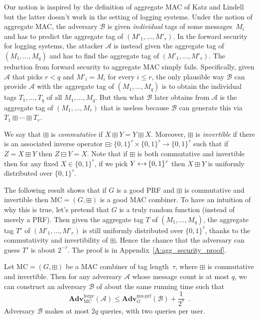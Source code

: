 \documentclass[sigconf]{sty/acmart}
\newcommand{\heading}[1]{\vspace{6pt}\noindent{\underline{\textsc{#1}}}}
\newcommand{\bits}{\{0, 1\}}
\newcommand{\advA}{{\mathcal A}}
\newcommand{\muprf}{\mathrm{mu}\textrm{-}\mathrm{prf}}
\newcommand{\Adv}{\mathbf{Adv}}
\newcommand{\getsr}{{\:{\leftarrow{\hspace*{-3pt}\raisebox{.75pt}{$\scriptscriptstyle\$$}}}\:}}
\newcommand{\advB}{{\mathcal B}}
\newcommand{\forge}{\mathrm{forge}}
\newcommand{\AMAC}{\mathrm{MC}}
\newcommand{\combine}{\boxplus}
\newcommand{\combinv}{\boxminus}
\begin{document}
\heading{Discussion.} Our notion is inspired by the definition of aggregate MAC of Katz and Lindell~\cite{XOR}
but the latter doesn't work in the setting of logging systems. 
Under the notion of aggregate MAC, the adversary $\advB$ is given \emph{individual} tags of some messages~$M_i$
and has to predict the aggregate tag of $(M'_1, \ldots, M'_r)$. 
In the forward security for logging systems, the attacker $\advA$ is instead given the aggregate tag of $(M_1, \ldots, M_q)$
and has to find the aggregate tag of $(M'_1, \ldots, M'_r)$. 
The reduction from forward security to aggregate MAC simply fails. 
Specifically, 
given $\advA$ that picks $r < q$ and $M'_i = M_i$ for every $i \leq r$, 
the only plausible way $\advB$ can provide $\advA$ with the aggregate tag of $(M_1, \ldots, M_q)$
is to obtain the individual tags $T_1, \ldots, T_q$ of all $M_1, \ldots, M_q$. 
But then what $\advB$ later obtains from $\advA$ is the aggregate tag of $(M_1, \ldots, M_r)$
that is useless because $\advB$ can generate this via $T_1 \boxplus \cdots \boxplus T_r$. 

 







\heading{Security analysis.} 
We say that $\combine$ is \emph{commutative} if $X \combine Y = Y \combine X$. 
Moreover, $\combine$ is \emph{invertible} if there is an associated inverse operator $\combinv: \bits^\tau \times \bits^\tau \to \bits^\tau$
such that if $Z = X \combine Y$ then $Z \combinv Y = X$. 
Note that if $\combine$ is both commutative and invertible then for any fixed $X \in \bits^\tau$, if we pick $Y \getsr \bits^\tau$
then $X \combine Y$ is uniformly distributed over $\bits^\tau$. 


The following result shows that if $G$ is a good PRF and $\combine$ is commutative and invertible then $\AMAC = (G, \combine)$ is a good MAC combiner. 
To have an intuition of why this is true, let's pretend that $G$ is a truly random function (instead of merely a PRF). 
Then given the aggregate tag $T$ of $(M_1, \ldots, M_q)$, the aggregate tag $T'$ of $(M'_1, \ldots, M'_r)$ is still uniformly distributed over $\bits^\tau$, 
thanks to the commutativity and invertibility of $\combine$. 
Hence the chance that the adversary can guess $T'$ is about $2^{-\tau}$. 
The proof is in Appendix~\ref{A:agg_security_proof}. 


\begin{proposition}
Let $\AMAC = (G, \combine)$ be a MAC combiner of tag length~$\tau$, 
where $\combine$ is commutative and invertible. 
Then for any adversary $\advA$ whose message count is at most $q$, 
we can construct an adversary $\advB$  of about the same running time such that
\[ 
\Adv^{\forge}_\AMAC(\advA) \leq \Adv^{\muprf}_G(\advB) +  \frac{1}{2^\tau}\enspace. 
\] 
Adversary $\advB$ makes at most $2q$ queries, with two queries per user.  
\label{P:agg}
\end{proposition}
\end{document}
